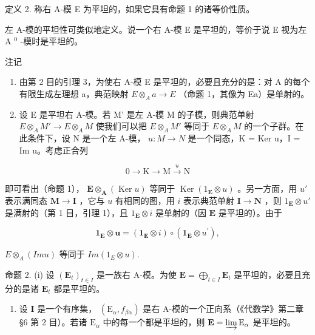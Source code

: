 定义 2. 称右 A-模 E 为平坦的，如果它具有命题 1 的诸等价性质。

左 A-模的平坦性可类似地定义。说一个右 A-模 E 是平坦的，等价于说 E 视为左 A \(^{0}\) -模时是平坦的。

注记

\begin{enumerate}
\def\labelenumi{(\arabic{enumi})}
\item
  由第 2 目的引理 3，为使右 A-模 E 是平坦的，必要且充分的是：对 A 的每个有限生成左理想 a，典范映射 \(E \otimes_{A} a \to E\) （命题 1，其像为 Ea）是单射的。
\item
  设 E 是平坦右 A-模。若 M' 是左 A-模 M 的子模，则典范单射 \(E \otimes_{A} M' \to E \otimes_{A} M\) 使我们可以把 \(E \otimes_{A} M'\) 等同于 \(E \otimes_{A} M\) 的一个子群。在此条件下，设 N 是一个左 A-模， \(u: M \to N\) 是一个同态，K = Ker u，I = Im u。考虑正合列
\end{enumerate}

\[
0 \longrightarrow \mathrm{K} \longrightarrow \mathrm{M} \stackrel {u} {\longrightarrow} \mathrm{N}
\]

即可看出（命题 1）， \(\mathbf{E} \otimes_{\mathbf{A}} (\operatorname{Ker} u)\) 等同于 \(\operatorname{Ker}(1_{\mathbf{E}} \otimes u)\) 。另一方面，用 \(u'\) 表示满同态 \(\mathbf{M} \to \mathbf{I}\) ，它与 \(u\) 有相同的图，用 \(i\) 表示典范单射 \(\mathbf{I} \to \mathbf{N}\) ，则 \(1_{\mathbf{E}} \otimes u'\) 是满射的（第 1 目，引理 1），且 \(1_{\mathbf{E}} \otimes i\) 是单射的（因 \(\mathbf{E}\) 是平坦的）。由于

\[
\mathbf {1} _ {\mathbf {E}} \otimes \boldsymbol {u} = (\mathbf {1} _ {\mathbf {E}} \otimes i) \circ (\mathbf {1} _ {\mathbf {E}} \otimes u ^ {\prime}),
\]

\(E \otimes_{A} (Im u) \text{ 等同于 } Im(1_{E} \otimes u).\)

命题 2. (i) 设 \((\mathbf{E}_t)_{t \in I}\) 是一族右 A-模。为使 \(\mathbf{E} = \bigoplus_{t \in I} \mathbf{E}_t\) 是平坦的，必要且充分的是诸 \(\mathbf{E}_t\) 都是平坦的。

\begin{enumerate}
\def\labelenumi{(\roman{enumi})}
\setcounter{enumi}{1}
\tightlist
\item
  设 \(\mathbf{I}\) 是一个有序集， \((\mathrm{E}_{\alpha}, f_{\beta \alpha})\) 是右 A-模的一个正向系（《代数学》第二章 §6 第 2 目）。若诸 \(\mathrm{E}_{\alpha}\) 中的每一个都是平坦的，则 \(\mathbf{E} = \varinjlim \mathrm{E}_{\alpha}\) 是平坦的。
\end{enumerate}

